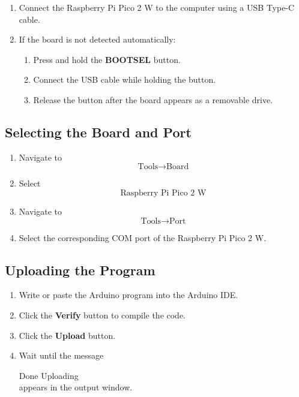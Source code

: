 \documentclass[12pt,a4paper]{article}
\begin{document}
\begin{enumerate}
    \item Connect the Raspberry Pi Pico 2 W to the computer using a USB Type-C cable.
    
    \item If the board is not detected automatically:
    \begin{enumerate}
        \item Press and hold the \textbf{BOOTSEL} button.
        \item Connect the USB cable while holding the button.
        \item Release the button after the board appears as a removable drive.
    \end{enumerate}
\end{enumerate}

\subsection{Selecting the Board and Port}

\begin{enumerate}
    \item Navigate to
    \[
    \text{Tools} \rightarrow \text{Board}
    \]

    \item Select
    \[
    \text{Raspberry Pi Pico 2 W}
    \]

    \item Navigate to
    \[
    \text{Tools} \rightarrow \text{Port}
    \]

    \item Select the corresponding COM port of the Raspberry Pi Pico 2 W.
\end{enumerate}

\subsection{Uploading the Program}

\begin{enumerate}
    \item Write or paste the Arduino program into the Arduino IDE.
    \item Click the \textbf{Verify} button to compile the code.
    \item Click the \textbf{Upload} button.
    \item Wait until the message

Done Uploading\\
appears in the output window.
\end{enumerate}
\end{document}
